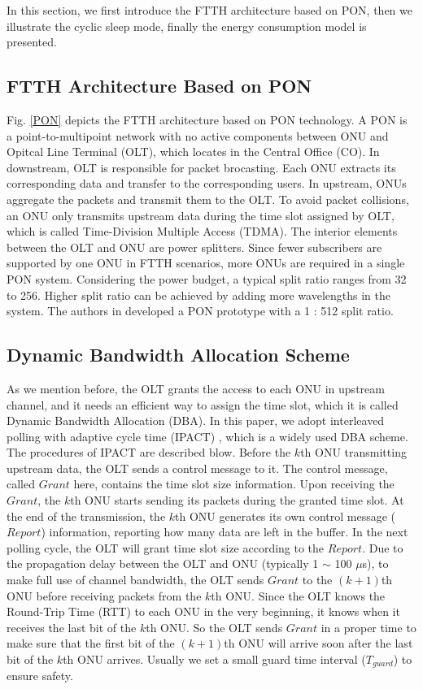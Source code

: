 \documentclass[journal]{IEEEtran}
\begin{document}
In this section, we first introduce the FTTH architecture based on PON, then we illustrate the cyclic sleep mode, finally the energy consumption model is presented.

\subsection{FTTH Architecture Based on PON}
Fig. \ref{PON} depicts the FTTH architecture based on PON technology. A PON is a point-to-multipoint network with no active components between ONU and Opitcal Line Terminal (OLT), which locates in the Central Office (CO). In downstream, OLT is responsible for packet brocasting. Each ONU extracts its corresponding data and transfer to the corresponding users. In upstream, ONUs aggregate the packets and transmit them to the OLT. To avoid packet collisions, an ONU only transmits upstream data during the time slot assigned by OLT, which is called Time-Division Multiple Access (TDMA). The interior elements between the OLT and ONU are power splitters. Since fewer subscribers are supported by one ONU in FTTH scenarios, more ONUs are required in a single PON system. Considering the power budget, a typical split ratio ranges from 32 to 256. Higher split ratio can be achieved by adding more wavelengths in the system. The authors in \cite{luo2013time} developed a PON prototype with a 1 : 512 split ratio.

\subsection{Dynamic Bandwidth Allocation Scheme}
As we mention before, the OLT grants the access to each ONU in upstream channel, and it needs an efficient way to assign the time slot, which it is called Dynamic Bandwidth Allocation (DBA). In this paper, we adopt interleaved polling with adaptive cycle time (IPACT) \cite{983911}, which is a widely used DBA scheme. The procedures of IPACT are described blow. Before the $k$th ONU transmitting upstream data, the OLT sends a control message to it. The control message, called $Grant$ here, contains the time slot size information. Upon receiving the $Grant$, the $k$th ONU starts sending its packets during the granted time slot. At the end of the transmission, the $k$th ONU generates its own control message ($Report$) information, reporting how many data are left in the buffer. In the next polling cycle, the OLT will grant time slot size according to the $Report$. Due to the propagation delay between the OLT and ONU (typically 1 $\sim$ 100 $\mu$s), to make full use of channel bandwidth, the OLT sends $Grant$ to the $(k + 1)$th ONU before receiving packets from the $k$th ONU. Since the OLT knows the Round-Trip Time (RTT) to each ONU in the very beginning, it knows when it receives the last bit of the $k$th ONU. So the OLT sends $Grant$ in a proper time to make sure that the first bit of the $(k + 1)$th ONU will arrive soon after the last bit of the $k$th ONU arrives. Usually we set a small guard time interval ($T_{guard}$) to ensure safety.
\end{document}
